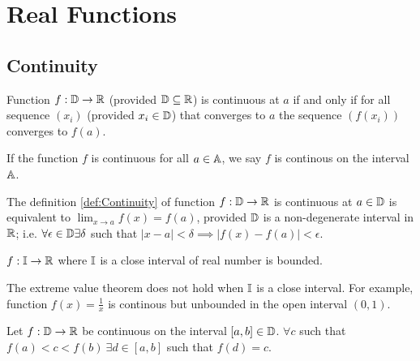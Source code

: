 \documentclass[../note.tex]{subfiles}
\begin{document}
\section{Real Functions}

\subsection{Continuity}

\begin{definition}\label{def:Continuity}
	Function $f: \mathbb{D} \rightarrow \mathbb{R}$ (provided $\mathbb{D} \subseteq \mathbb{R}$) is continuous at $a$
	if and only if for all sequence $(x_i)$ (provided $x_i \in \mathbb{D}$) that converges to $a$ the sequence $(f(x_i))$ converges to $f(a)$.

	If the function $f$ is continuous for all $a \in \mathbb{A}$, we say $f$ is continous on the interval $\mathbb{A}$.
\end{definition}

\begin{theorem}
	The definition \ref{def:Continuity} of function $f:\mathbb{D} \rightarrow \mathbb{R}$ is continuous at $a\in \mathbb{D}$ is equivalent to $\lim _{x\to a}f(x) = f(a)$, provided $\mathbb{D}$ is a non-degenerate interval in $\mathbb{R}$; 
	i.e. $\forall \epsilon \in \mathbb{D} \exists \delta $ such that $|x-a| < \delta \implies |f(x)-f(a)| < \epsilon$.
\end{theorem}

\begin{definition}
	$f:\mathbb{I} \rightarrow \mathbb{R}$ where $\mathbb{I}$ is a close interval of real number is bounded.
\end{definition}

\begin{remark}
	The extreme value theorem does not hold when $\mathbb{I}$ is a close interval. For example, function $f(x)=\frac{1}{x}$ is continous but unbounded in the open interval $(0,1)$.
\end{remark}

\begin{theorem}
	Let $f: \mathbb{D} \rightarrow \mathbb{R}$ be continuous on the interval $[a,b]\in \mathbb{D}$. $\forall c $ such that $f(a)<c<f(b)\ \exists d \in [a,b] $ such that $ f(d) = c$.  
\end{theorem}
\end{document}
